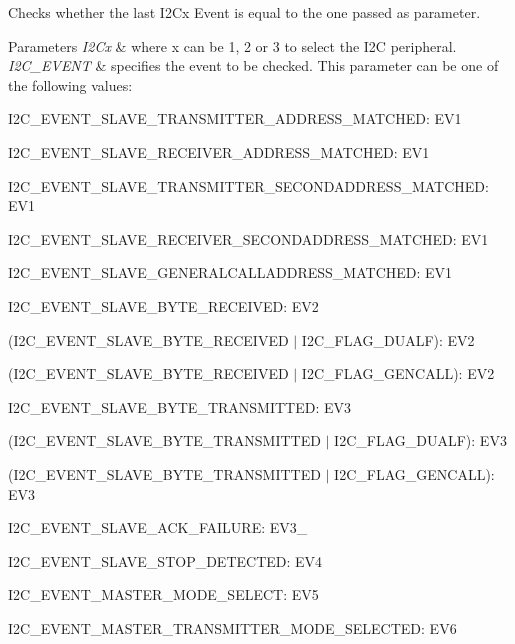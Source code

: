 Checks whether the last I2\+Cx Event is equal to the one passed as parameter. 


\begin{DoxyParams}{Parameters}
{\em I2\+Cx} & where x can be 1, 2 or 3 to select the I2C peripheral. \\
\hline
{\em I2\+C\+\_\+\+E\+V\+E\+NT} & specifies the event to be checked. This parameter can be one of the following values\+: \begin{DoxyItemize}
\item I2\+C\+\_\+\+E\+V\+E\+N\+T\+\_\+\+S\+L\+A\+V\+E\+\_\+\+T\+R\+A\+N\+S\+M\+I\+T\+T\+E\+R\+\_\+\+A\+D\+D\+R\+E\+S\+S\+\_\+\+M\+A\+T\+C\+H\+ED\+: E\+V1 \item I2\+C\+\_\+\+E\+V\+E\+N\+T\+\_\+\+S\+L\+A\+V\+E\+\_\+\+R\+E\+C\+E\+I\+V\+E\+R\+\_\+\+A\+D\+D\+R\+E\+S\+S\+\_\+\+M\+A\+T\+C\+H\+ED\+: E\+V1 \item I2\+C\+\_\+\+E\+V\+E\+N\+T\+\_\+\+S\+L\+A\+V\+E\+\_\+\+T\+R\+A\+N\+S\+M\+I\+T\+T\+E\+R\+\_\+\+S\+E\+C\+O\+N\+D\+A\+D\+D\+R\+E\+S\+S\+\_\+\+M\+A\+T\+C\+H\+ED\+: E\+V1 \item I2\+C\+\_\+\+E\+V\+E\+N\+T\+\_\+\+S\+L\+A\+V\+E\+\_\+\+R\+E\+C\+E\+I\+V\+E\+R\+\_\+\+S\+E\+C\+O\+N\+D\+A\+D\+D\+R\+E\+S\+S\+\_\+\+M\+A\+T\+C\+H\+ED\+: E\+V1 \item I2\+C\+\_\+\+E\+V\+E\+N\+T\+\_\+\+S\+L\+A\+V\+E\+\_\+\+G\+E\+N\+E\+R\+A\+L\+C\+A\+L\+L\+A\+D\+D\+R\+E\+S\+S\+\_\+\+M\+A\+T\+C\+H\+ED\+: E\+V1 \item I2\+C\+\_\+\+E\+V\+E\+N\+T\+\_\+\+S\+L\+A\+V\+E\+\_\+\+B\+Y\+T\+E\+\_\+\+R\+E\+C\+E\+I\+V\+ED\+: E\+V2 \item (I2\+C\+\_\+\+E\+V\+E\+N\+T\+\_\+\+S\+L\+A\+V\+E\+\_\+\+B\+Y\+T\+E\+\_\+\+R\+E\+C\+E\+I\+V\+ED $\vert$ I2\+C\+\_\+\+F\+L\+A\+G\+\_\+\+D\+U\+A\+LF)\+: E\+V2 \item (I2\+C\+\_\+\+E\+V\+E\+N\+T\+\_\+\+S\+L\+A\+V\+E\+\_\+\+B\+Y\+T\+E\+\_\+\+R\+E\+C\+E\+I\+V\+ED $\vert$ I2\+C\+\_\+\+F\+L\+A\+G\+\_\+\+G\+E\+N\+C\+A\+LL)\+: E\+V2 \item I2\+C\+\_\+\+E\+V\+E\+N\+T\+\_\+\+S\+L\+A\+V\+E\+\_\+\+B\+Y\+T\+E\+\_\+\+T\+R\+A\+N\+S\+M\+I\+T\+T\+ED\+: E\+V3 \item (I2\+C\+\_\+\+E\+V\+E\+N\+T\+\_\+\+S\+L\+A\+V\+E\+\_\+\+B\+Y\+T\+E\+\_\+\+T\+R\+A\+N\+S\+M\+I\+T\+T\+ED $\vert$ I2\+C\+\_\+\+F\+L\+A\+G\+\_\+\+D\+U\+A\+LF)\+: E\+V3 \item (I2\+C\+\_\+\+E\+V\+E\+N\+T\+\_\+\+S\+L\+A\+V\+E\+\_\+\+B\+Y\+T\+E\+\_\+\+T\+R\+A\+N\+S\+M\+I\+T\+T\+ED $\vert$ I2\+C\+\_\+\+F\+L\+A\+G\+\_\+\+G\+E\+N\+C\+A\+LL)\+: E\+V3 \item I2\+C\+\_\+\+E\+V\+E\+N\+T\+\_\+\+S\+L\+A\+V\+E\+\_\+\+A\+C\+K\+\_\+\+F\+A\+I\+L\+U\+RE\+: E\+V3\+\_ \item I2\+C\+\_\+\+E\+V\+E\+N\+T\+\_\+\+S\+L\+A\+V\+E\+\_\+\+S\+T\+O\+P\+\_\+\+D\+E\+T\+E\+C\+T\+ED\+: E\+V4 \item I2\+C\+\_\+\+E\+V\+E\+N\+T\+\_\+\+M\+A\+S\+T\+E\+R\+\_\+\+M\+O\+D\+E\+\_\+\+S\+E\+L\+E\+CT\+: E\+V5 \item I2\+C\+\_\+\+E\+V\+E\+N\+T\+\_\+\+M\+A\+S\+T\+E\+R\+\_\+\+T\+R\+A\+N\+S\+M\+I\+T\+T\+E\+R\+\_\+\+M\+O\+D\+E\+\_\+\+S\+E\+L\+E\+C\+T\+ED\+: E\+V6 ~\newline

\end{DoxyItemize}
\end{DoxyParams}
